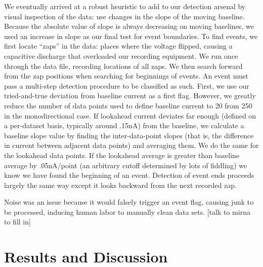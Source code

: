 \documentclass[aps,prl,preprint,groupedaddress]{revtex4}
\begin{document}
We eventually arrived at a robust heuristic to add to our detection arsenal by visual inspection of the data: use changes in the slope of the moving baseline.
Because the absolute value of slope is always decreasing on moving baselines, we used an increase in slope as our final test for event boundaries.
To find events, we first locate ``zaps'' in the data: places where the voltage flipped, causing a capacitive discharge that overloaded our recording equipment.
We run once through the data file, recording locations of all zaps.
We then search forward from the zap positions when searching for beginnings of events.
An event must pass a multi-step detection procedure to be classified as such.
First, we use our tried-and-true deviation from baseline current as a first flag.
However, we greatly reduce the number of data points used to define baseline current to 20 from 250 in the monodirectional case.
If lookahead current deviates far enough (defined on a per-dataset basis, typically around .15nA) from the baseline, we calculate a baseline slope value by finding the inter-data-point slopes (that is, the difference in current between adjacent data points) and averaging them.
We do the same for the lookahead data points.
If the lookahead average is greater than baseline average by .05nA/point (an arbitrary cutoff determined by lots of fiddling) we know we have found the beginning of an event.
Detection of event ends proceeds largely the same way except it looks backward from the next recorded zap. 

Noise was an issue because it would falsely trigger an event flag, causing junk to be processed, inducing human labor to manually clean data sets. 
[talk to mirna to fill in]

\section{Results and Discussion}
\end{document}
